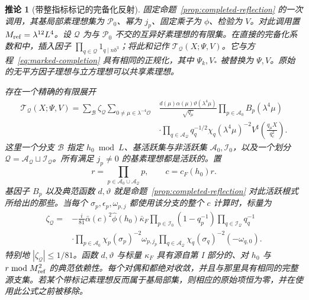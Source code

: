 \documentclass[11pt,a4paper]{article}
\numberwithin{equation}{section}
\numberwithin{figure}{section}
\newtheorem{corollary}[theorem]{推论}
\theoremstyle{definition}
\theoremstyle{remark}
\begin{document}
\begin{corollary}[带整指标标记的完备化反射]
\label{cor:marked-reflection}
固定命题~\ref{prop:completed-reflection} 的一次调用，其基局部素理想集为 \(\mathcal P_0\)、幂为 \(j_p\)、固定乘子为 \(\phi\)、检验为 \(V\)。对此调用置 \(M_{\rm ref}=\lambda^{12}L^4\)。设 \(\mathcal Q\) 为与 \(\mathcal P_0\) 不交的互异好素理想的有限集。在直接的完备化系数和中，插入因子 \(\prod_{q\in\mathcal Q}1_{q\mid nb^3}\)；将此和记作 \(\mathcal T_{\mathcal Q}(X;\Psi,V)\)。它与方程~\eqref{eq:marked-completion} 具有相同的正规化，其中 \(\Psi_k,V_*\) 被替换为 \(\Psi,V\)。原始的无平方因子理想与立方理想可以共享素理想。

存在一个精确的有限展开
\begin{equation}\label{eq:marked-reflection}
 \begin{split}
 \mathcal T_{\mathcal Q}(X;\Psi,V)
 =\sum_{\mathcal B}\zeta_{\mathcal Q}
 \sum_{0\ne\mu\in\lambda^{-4}\mathcal O}
 &\frac{d(\mu)\alpha(\mu)\vartheta(\lambda^4\mu)}{\sqrt{q_\mu}}
 \prod_{p\in\mathcal A_0}B_p(\lambda^4\mu)\\
 &\cdot\prod_{q\in\mathcal A_{\mathcal Q}}
       q_q^{-1/2}\chi_q(\lambda^4\mu)^{-2}
 V^\sharp\!\left(\frac{q_\mu X}{q_c^2}\right).
 \end{split}
\end{equation}
这里一个分支 \(\mathcal B\) 指定 \(h_0\bmod L\)、基活跃集与非活跃集 \(\mathcal A_0,\mathcal I_0\)，以及一个划分 \(\mathcal Q=\mathcal A_{\mathcal Q}\sqcup\mathcal I_{\mathcal Q}\)。所有满足 \(j_p\ne0\) 的基素理想都是活跃的。置
\[
 r=\prod_{p\in\mathcal A_0\cup\mathcal A_{\mathcal Q}}p,
 \qquad c=c_F(h_0)r.
\]
基因子 \(B_p\) 以及典范函数 \(d,\vartheta\) 就是命题~\ref{prop:completed-reflection} 对此活跃根式所给出的那些。当每个 \(\sigma_p,\epsilon_p,\omega_{p,j}\) 都使用该分支的整个 \(c\) 计算时，标量为
\begin{equation}\label{eq:marked-reflection-phase}
 \begin{split}
 \zeta_{\mathcal Q}={}&-\frac{i}{81}\bar\alpha(c)^2
       \widehat\phi(h_0)\bar\kappa_F
       \prod_{p\in\mathcal I_0}(1-q_p^{-1})
       \prod_{q\in\mathcal I_{\mathcal Q}}q_q^{-1}\\
 &\cdot\prod_{p\in\mathcal A_0}\chi_p(\sigma_p)^{-2}\omega_{p,j_p}
       \prod_{q\in\mathcal A_{\mathcal Q}}
             \chi_q(\sigma_q)^{-2}(-\omega_{q,0}).
 \end{split}
\end{equation}
特别地 \(|\zeta_{\mathcal Q}|\le1/81\)。函数 \(d,\vartheta\) 与标量 \(\kappa_F\) 具有源自第 I 部分的、对 \(h_0\) 与 \(r\bmod M_{\rm ref}^2\) 的典范依赖性。每个对偶和都绝对收敛，并且与那里具有相同的完整源支集。若某个带标记素理想反而属于基局部集，则相应的原始项恒为零，并在使用此公式之前被移除。
\end{corollary}
\end{document}
